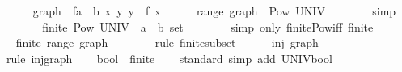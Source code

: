 \begin{isabellebody}
\ \ \ \ \isamarkupfalse%
\ {\isacharquery}{\kern0pt}graph\ {\isacharequal}{\kern0pt}\ {\isachardoublequoteopen}{\isasymlambda}f{\isacharcolon}{\kern0pt}{\isacharcolon}{\kern0pt}{\isacharprime}{\kern0pt}a\ {\isasymRightarrow}\ {\isacharprime}{\kern0pt}b{\isachardot}{\kern0pt}\ {\isacharbraceleft}{\kern0pt}{\isacharparenleft}{\kern0pt}x{\isacharcomma}{\kern0pt}\ y{\isacharparenright}{\kern0pt}{\isachardot}{\kern0pt}\ y\ {\isacharequal}{\kern0pt}\ f\ x{\isacharbraceright}{\kern0pt}{\isachardoublequoteclose}\isanewline
\ \ \ \ \isamarkupfalse%
\ {\isachardoublequoteopen}range\ {\isacharquery}{\kern0pt}graph\ {\isasymsubseteq}\ Pow\ UNIV{\isachardoublequoteclose}\isanewline
\ \ \ \ \ \ \isamarkupfalse%
\ simp\isanewline
\ \ \ \ \isamarkupfalse%
\ \isamarkupfalse%
\ {\isachardoublequoteopen}finite\ {\isacharparenleft}{\kern0pt}Pow\ {\isacharparenleft}{\kern0pt}UNIV\ {\isacharcolon}{\kern0pt}{\isacharcolon}{\kern0pt}\ {\isacharparenleft}{\kern0pt}{\isacharprime}{\kern0pt}a\ {\isacharasterisk}{\kern0pt}\ {\isacharprime}{\kern0pt}b{\isacharparenright}{\kern0pt}\ set{\isacharparenright}{\kern0pt}{\isacharparenright}{\kern0pt}{\isachardoublequoteclose}\isanewline
\ \ \ \ \ \ \isamarkupfalse%
\ {\isacharparenleft}{\kern0pt}simp\ only{\isacharcolon}{\kern0pt}\ finite{\isacharunderscore}{\kern0pt}Pow{\isacharunderscore}{\kern0pt}iff\ finite{\isacharparenright}{\kern0pt}\isanewline
\ \ \ \ \isamarkupfalse%
\ \isamarkupfalse%
\ {\isachardoublequoteopen}finite\ {\isacharparenleft}{\kern0pt}range\ {\isacharquery}{\kern0pt}graph{\isacharparenright}{\kern0pt}{\isachardoublequoteclose}\isanewline
\ \ \ \ \ \ \isamarkupfalse%
\ {\isacharparenleft}{\kern0pt}rule\ finite{\isacharunderscore}{\kern0pt}subset{\isacharparenright}{\kern0pt}\isanewline
\ \ \ \ \isamarkupfalse%
\ {\isachardoublequoteopen}inj\ {\isacharquery}{\kern0pt}graph{\isachardoublequoteclose}\isanewline
\ \ \ \ \ \ \isamarkupfalse%
\ {\isacharparenleft}{\kern0pt}rule\ inj{\isacharunderscore}{\kern0pt}graph{\isacharparenright}{\kern0pt}\isanewline
\ \ \isamarkupfalse%
\isanewline
{}\isamarkupfalse%
%
\endisatagproof
{\isafoldproof}%
%
\isadelimproof
\isanewline
%
\endisadelimproof
\isanewline
{}\isamarkupfalse%
\ bool\ {\isacharcolon}{\kern0pt}{\isacharcolon}{\kern0pt}\ finite\isanewline
%
\isadelimproof
\ \ %
\endisadelimproof
%
\isatagproof
{}\isamarkupfalse%
\ standard\ {\isacharparenleft}{\kern0pt}simp\ add{\isacharcolon}{\kern0pt}\ UNIV{\isacharunderscore}{\kern0pt}bool{\isacharparenright}{\kern0pt}%

\end{isabellebody}

